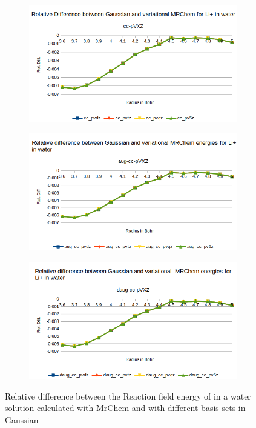 \documentclass[../master_thesis.tex]{subfiles}
\begin{document}
\begin{figure}[h!]
  \centering
  \begin{subfigure}[b]{0.75\linewidth}
    \includegraphics[width=\linewidth]{img/lipvarreldiff.png}
  \end{subfigure}
  \begin{subfigure}[b]{0.75\linewidth}
    \includegraphics[width=\linewidth]{img/lipvaraugreldiff.png}
  \end{subfigure}
  \begin{subfigure}[b]{0.75\linewidth}
    \includegraphics[width=\linewidth]{img/lipvardaugreldiff.png}
  \end{subfigure}
  \caption{Relative difference between the Reaction field energy of  in a water solution calculated with MrChem
  and with different basis sets in Gaussian}
  \label{fig:lipreldiffvar}
\end{figure}

\biblio
\end{document}
